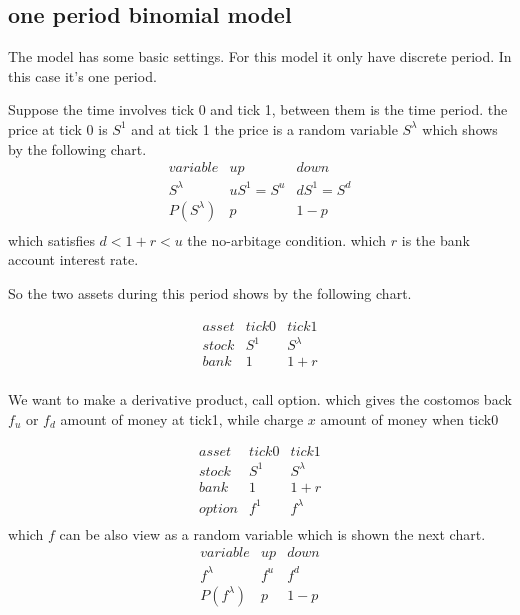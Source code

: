 \documentclass{article}
\theoremstyle{definition} %
\begin{document}
\subsection{one period binomial model}
The model has some basic settings.
For this model it only have discrete
period. In this case it's one period.

Suppose the time involves tick 0 and tick 1,
between them is the time period.
the price at tick 0 is $S^1$
and at tick 1 the price is a random variable
$S^\lambda$ which shows by the following chart.
$$
    \begin{array}{c|ccc}
        variable     & up       & down     \\
        S^\lambda    & uS^1=S^u & dS^1=S^d \\
        \hline
        P(S^\lambda) & p        & 1-p      \\
    \end{array}
$$
which satisfies $d<1+r<u$ the no-arbitage condition.
which $r$ is the bank account interest rate.

So the two assets during this period shows by
the following chart.

$$
    \begin{array}{c|ccc}
        asset & tick0 & tick1     \\
        stock & S^1   & S^\lambda \\
        \hline
        bank  & 1     & 1+r       \\
    \end{array}
$$

We want to make a derivative product,
call option.
which gives the costomos back $f_u$
or $f_d$ amount of money at tick1, while charge
$x$ amount of money when tick0

$$
    \begin{array}{c|ccc}
        asset  & tick0 & tick1     \\
        stock  & S^1   & S^\lambda \\
        \hline
        bank   & 1     & 1+r       \\
        \hline
        option & f^1   & f^\lambda \\
    \end{array}
$$
which $f$ can be also view as a random
variable which is shown the next chart.
$$
    \begin{array}{c|ccc}
        variable     & up  & down \\
        f^\lambda    & f^u & f^d  \\
        \hline
        P(f^\lambda) & p   & 1-p  \\
    \end{array}
$$
\end{document}
